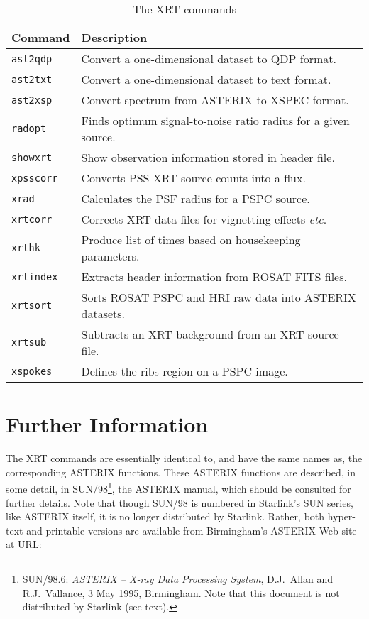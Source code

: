 \documentclass[twoside,11pt]{article}
\newcommand{\xlabel}[1]{}
\renewcommand{\_}{\texttt{\symbol{95}}}
\begin{document}
\begin{table}[htbp]

\begin{center}
\begin{tabular}{ll}
Command  & Description \\ \hline
{\tt ast2qdp}  & Convert a one-dimensional dataset to QDP format. \\
{\tt ast2txt}  & Convert a one-dimensional dataset to text format. \\
{\tt ast2xsp}  & Convert spectrum from ASTERIX to XSPEC format. \\
{\tt radopt}   & Finds optimum signal-to-noise ratio radius for a given 
 source. \\
{\tt showxrt}  & Show observation information stored in header file. \\
{\tt xpsscorr} & Converts PSS XRT source counts into a flux. \\
{\tt xrad}     & Calculates the PSF radius for a PSPC source. \\
{\tt xrtcorr}  & Corrects XRT data files for vignetting effects \emph{etc}. \\
{\tt xrthk}    & Produce list of times based on housekeeping parameters. \\
{\tt xrtindex} & Extracts header information from ROSAT FITS files. \\
{\tt xrtsort}  & Sorts ROSAT PSPC and HRI raw data into ASTERIX datasets. \\
{\tt xrtsub}   & Subtracts an XRT background from an XRT source file. \\
{\tt xspokes}  & Defines the ribs region on a PSPC image. \\
\end{tabular}
\end{center}

\begin{quote}
\caption{The XRT commands \label{XRTCOMMANDS} }
\end{quote}

\end{table}


\section{\xlabel{INFO}\label{INFO}Further Information}

The XRT commands are essentially identical to, and have the same names as,
the corresponding ASTERIX functions.  These ASTERIX functions are
described, in some detail, in SUN/98\footnote{SUN/98.6: {\it ASTERIX --
X-ray Data Processing System},  D.J.~Allan and R.J.~Vallance, 3 May 1995,
Birmingham.  Note that this document is not distributed by Starlink (see
text).}, the ASTERIX manual, which should be consulted for further details.
Note that though SUN/98 is numbered in Starlink's SUN series, like ASTERIX
itself, it is no longer distributed by Starlink.  Rather, both hyper-text
and printable versions are available from Birmingham's ASTERIX Web site
at URL:
\end{document}
